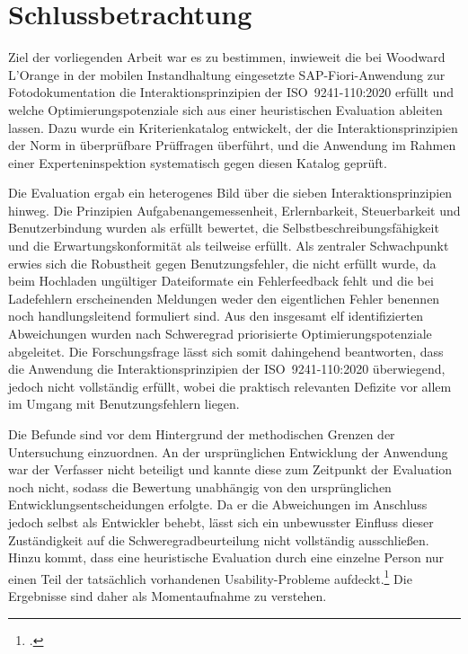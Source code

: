 \chapter{Schlussbetrachtung}
\label{chapter:kapitel6}

Ziel der vorliegenden Arbeit war es zu bestimmen, inwieweit die bei Woodward L'Orange in der mobilen Instandhaltung eingesetzte SAP-Fiori-Anwendung zur Fotodokumentation die Interaktionsprinzipien der ISO~9241-110:2020 erfüllt und welche Optimierungspotenziale sich aus einer heuristischen Evaluation ableiten lassen.
Dazu wurde ein Kriterienkatalog entwickelt, der die Interaktionsprinzipien der Norm in überprüfbare Prüffragen überführt, und die Anwendung im Rahmen einer Experteninspektion systematisch gegen diesen Katalog geprüft.

Die Evaluation ergab ein heterogenes Bild über die sieben Interaktionsprinzipien hinweg.
Die Prinzipien Aufgabenangemessenheit, Erlernbarkeit, Steuerbarkeit und Benutzerbindung wurden als erfüllt bewertet, die Selbstbeschreibungsfähigkeit und die Erwartungskonformität als teilweise erfüllt.
Als zentraler Schwachpunkt erwies sich die Robustheit gegen Benutzungsfehler, die nicht erfüllt wurde, da beim Hochladen ungültiger Dateiformate ein Fehlerfeedback fehlt und die bei Ladefehlern erscheinenden Meldungen weder den eigentlichen Fehler benennen noch handlungsleitend formuliert sind.
Aus den insgesamt elf identifizierten Abweichungen wurden nach Schweregrad priorisierte Optimierungspotenziale abgeleitet.
Die Forschungsfrage lässt sich somit dahingehend beantworten, dass die Anwendung die Interaktionsprinzipien der ISO~9241-110:2020 überwiegend, jedoch nicht vollständig erfüllt, wobei die praktisch relevanten Defizite vor allem im Umgang mit Benutzungsfehlern liegen.

Die Befunde sind vor dem Hintergrund der methodischen Grenzen der Untersuchung einzuordnen.
An der ursprünglichen Entwicklung der Anwendung war der Verfasser nicht beteiligt und kannte diese zum Zeitpunkt der Evaluation noch nicht, sodass die Bewertung unabhängig von den ursprünglichen Entwicklungsentscheidungen erfolgte.
Da er die Abweichungen im Anschluss jedoch selbst als Entwickler behebt, lässt sich ein unbewusster Einfluss dieser Zuständigkeit auf die Schweregradbeurteilung nicht vollständig ausschließen.
Hinzu kommt, dass eine heuristische Evaluation durch eine einzelne Person nur einen Teil der tatsächlich vorhandenen Usability-Probleme aufdeckt.\footcite[Vgl.][S.~209]{nielsen1993mathematical}
Die Ergebnisse sind daher als Momentaufnahme zu verstehen.

